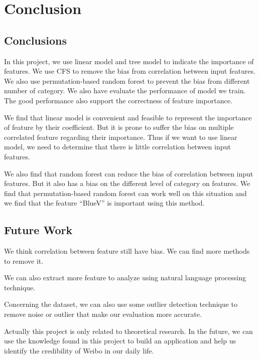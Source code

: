 \iffalse

\fi

\chapter{Conclusion}
\section{Conclusions}
In this project, we use linear model and tree model to indicate the importance of features. We use CFS to remove the bias from correlation between input features. We also use permutation-based random forest to prevent the bias from different number of category. We also have evaluate the performance of model we train. The good performance also support the correctness of feature importance.

We find that linear model is convenient and feasible to represent the importance of feature by their coefficient. But it is prone to suffer the bias on multiple correlated feature regarding their importance. Thus if we want to use linear model, we need to determine that there is little correlation between input features.

We also find that random forest can reduce the bias of correlation between input features. But it also has a bias on the different level of category on features. We find that permutation-based random forest can work well on this situation and we find that the feature ``BlueV'' is important using this method.

\section{Future Work}
We think correlation between feature still have bias. We can find more methods to remove it.

We can also extract more feature to analyze using natural language processing technique. 

Concerning the dataset, we can also use some outlier detection technique to remove noise or outlier that make our evaluation more accurate.

Actually this project is only related to theoretical research. In the future, we can use the knowledge found in this project to build an application and help us identify the credibility of Weibo in our daily life.